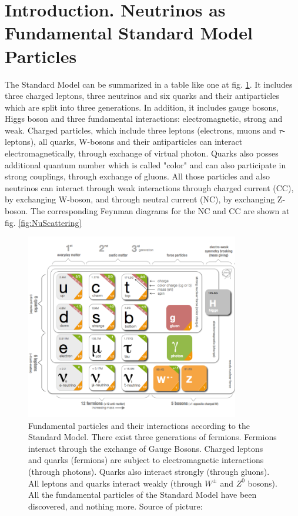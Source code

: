 \section{Introduction. Neutrinos as Fundamental Standard Model Particles}

The Standard Model can be summarized in a table like one at fig. \ref{fig:StandardModel}. It includes three charged leptons, three neutrinos and six quarks and their antiparticles which are split into three generations. In addition, it includes gauge bosons, Higgs boson and three fundamental interactions: electromagnetic, strong and weak. Charged particles, which include three leptons (electrons, muons and $\tau$-leptons), all quarks, W-bosons and their antiparticles can interact electromagnetically, through exchange of virtual photon. Quarks also posses additional quantum number which is called "color" and can also participate in strong couplings, through exchange of gluons. All those particles and also neutrinos can interact through weak interactions through charged current (CC), by exchanging W-boson, and through neutral current (NC), by exchanging Z-boson. The corresponding Feynman diagrams for the NC and CC are shown at fig. \ref{fig:NuScattering}\\

\begin{figure}
\caption{Fundamental particles and their interactions according to the Standard Model. There exist three generations of fermions. Fermions interact through the exchange of Gauge Bosons. Charged leptons and quarks (fermions) are subject to electromagnetic interactions (through photons). Quarks also interact strongly (through gluons). All leptons and quarks interact weakly (through $W^{\pm}$ and $Z^0$ bosons). All the fundamental particles of the Standard Model have been discovered, and nothing more. Source of picture: \cite{ref_fig_StandardModel}}
\label{fig:StandardModel}
\centering 
\includegraphics[width=0.83\textwidth, keepaspectratio=true]{figs/StandardModel.png}
\end{figure}


